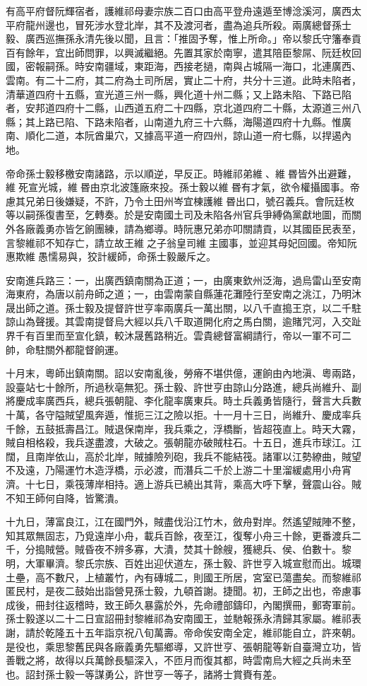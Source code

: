 \begin{pinyinscope}
有高平府督阮輝宿者，護維祁母妻宗族二百口由高平登舟遠遁至博淰溪河，廣西太平府龍州邊也，冒死涉水登北岸，其不及渡河者，盡為追兵所殺。兩廣總督孫士毅、廣西巡撫孫永清先後以聞，且言：「推固予奪，惟上所命。」帝以黎氏守籓奉貢百有餘年，宜出師問罪，以興滅繼絕。先置其家於南寧，遣其陪臣黎屌、阮廷枚回國，密報嗣孫。時安南疆域，東距海，西接老撾，南與占城隔一海口，北連廣西、雲南。有二十二府，其二府為土司所居，實止二十府，共分十三道。此時未陷者，清華道四府十五縣，宣光道三州一縣，興化道十州二縣；又上路未陷、下路已陷者，安邦道四府十二縣，山西道五府二十四縣，京北道四府二十縣，太源道三州八縣；其上路已陷、下路未陷者，山南道九府三十六縣，海陽道四府十九縣。惟廣南、順化二道，本阮酋巢穴，又據高平道一府四州，諒山道一府七縣，以捍遏內地。

帝命孫士毅移檄安南諸路，示以順逆，早反正。時維祁弟維、維昬皆外出避難，維死宣光城，維昬由京北波篷廠來投。孫士毅以維昬有才氣，欲令權攝國事。帝慮其兄弟日後嫌疑，不許，乃令土田州岑宜棟護維昬出口，號召義兵。會阮廷枚等以嗣孫復書至，乞轉奏。於是安南國土司及未陷各州官兵爭縛偽黨獻地圖，而關外各廠義勇亦皆乞餉團練，請為鄉導。時阮惠兄弟亦叩關請貢，以其國臣民表至，言黎維祁不知存亡，請立故王維之子翁皇司維主國事，並迎其母妃回國。帝知阮惠欺維愚懦易與，狡計緩師，命孫士毅嚴斥之。

安南進兵路三：一，出廣西鎮南關為正道；一，由廣東欽州泛海，過烏雷山至安南海東府，為唐以前舟師之道；一，由雲南蒙自縣蓮花灘陸行至安南之洮江，乃明沐晟出師之道。孫士毅及提督許世亨率兩廣兵一萬出關，以八千直搗王京，以二千駐諒山為聲援。其雲南提督烏大經以兵八千取道開化府之馬白關，逾賭咒河，入交趾界千有百里而至宣化鎮，較沐晟舊路稍近。雲貴總督富綱請行，帝以一軍不可二帥，命駐關外都龍督餉運。

十月末，粵師出鎮南關。詔以安南亂後，勞瘠不堪供億，運餉由內地滇、粵兩路，設臺站七十餘所，所過秋亳無犯。孫士毅、許世亨由諒山分路進，總兵尚維升、副將慶成率廣西兵，總兵張朝龍、李化龍率廣東兵。時土兵義勇皆隨行，聲言大兵數十萬，各守隘賊望風奔遁，惟扼三江之險以拒。十一月十三日，尚維升、慶成率兵千餘，五鼓抵壽昌江。賊退保南岸，我兵乘之，浮橋斷，皆超筏直上。時天大霧，賊自相格殺，我兵遂盡渡，大破之。張朝龍亦破賊柱石。十五日，進兵市球江。江闊，且南岸依山，高於北岸，賊據險列砲，我兵不能結筏。諸軍以江勢繚曲，賊望不及遠，乃陽運竹木造浮橋，示必渡，而潛兵二千於上游二十里溜緩處用小舟宵濟。十七日，乘筏薄岸相持。適上游兵已繞出其背，乘高大呼下擊，聲震山谷。賊不知王師何自降，皆驚潰。

十九日，薄富良江，江在國門外，賊盡伐沿江竹木，斂舟對岸。然遙望賊陣不整，知其眾無固志，乃覓遠岸小舟，載兵百餘，夜至江，復奪小舟三十餘，更番渡兵二千，分搗賊營。賊昏夜不辨多寡，大潰，焚其十餘艘，獲總兵、侯、伯數十。黎明，大軍畢濟。黎氏宗族、百姓出迎伏道左，孫士毅、許世亨入城宣慰而出。城環土壘，高不數尺，上植叢竹，內有磚城二，則國王所居，宮室已蕩盡矣。而黎維祁匿民村，是夜二鼓始出詣營見孫士毅，九頓首謝。捷聞。初，王師之出也，帝慮事成後，冊封往返稽時，致王師久暴露於外，先命禮部鑄印，內閣撰冊，郵寄軍前。孫士毅遂以二十二日宣詔冊封黎維祁為安南國王，並馳報孫永清歸其家屬。維祁表謝，請於乾隆五十五年詣京祝八旬萬壽。帝命俟安南全定，維祁能自立，許來朝。是役也，乘思黎舊民與各廠義勇先驅鄉導，又許世亨、張朝龍等新自臺灣立功，皆善戰之將，故得以兵萬餘長驅深入，不匝月而復其都，時雲南烏大經之兵尚未至也。詔封孫士毅一等謀勇公，許世亨一等子，諸將士賞賚有差。


\end{pinyinscope}
